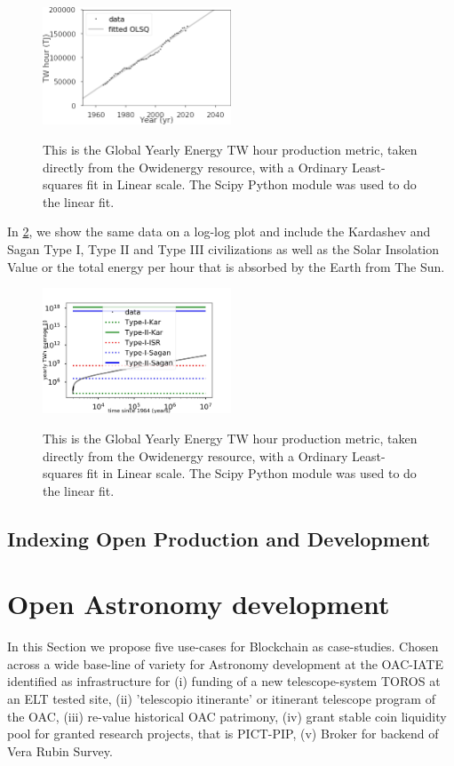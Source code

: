 \documentclass[final,5p,times,twocolumn,authoryear]{elsarticle}
\begin{document}
\begin{figure}
    \centering
    \includegraphics[width=0.5\textwidth]{figs/fig1_kard.png}
    \label{fig:kardashev1}
    \caption{This is the Global Yearly Energy TW hour production metric, taken directly from the Owidenergy resource, with a Ordinary Least-squares fit in Linear scale. The Scipy Python module was used to do the linear fit.}
\end{figure}

In \ref{fig:kardashev2}, we show the same data on a log-log plot and include the Kardashev and Sagan Type I, Type II and Type III civilizations as well as the Solar Insolation Value or the total energy per hour that is absorbed by the Earth from The Sun. 
\begin{figure}
    \centering
    \includegraphics[width=0.5\textwidth]{figs/fig2_kar.jpg}
    \label{fig:kardashev2}
    \caption{This is the Global Yearly Energy TW hour production metric, taken directly from the Owidenergy resource, with a Ordinary Least-squares fit in Linear scale. The Scipy Python module was used to do the linear fit.}
\end{figure}

\subsection{Indexing Open Production and Development}
\section{Open Astronomy development}
\label{sec:btc4}

In this Section we propose five use-cases for Blockchain as case-studies. Chosen across a wide base-line of variety for Astronomy development at the OAC-IATE identified as infrastructure for (i) funding of a new telescope-system TOROS at an ELT tested site, (ii) 'telescopio itinerante' or itinerant telescope program of the OAC, (iii) re-value historical OAC patrimony, (iv) grant stable coin liquidity pool for granted research projects, that is PICT-PIP, (v) Broker for backend of Vera Rubin Survey. 
\end{document}
